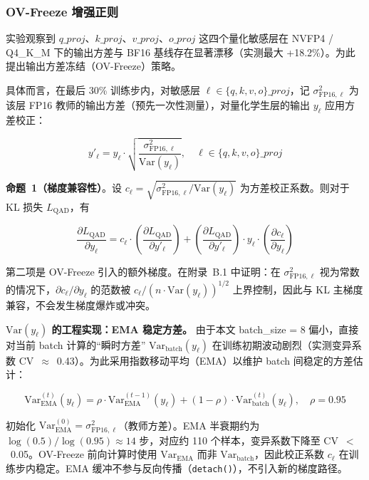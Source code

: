 \documentclass[UTF8,a4paper,10pt,twocolumn]{ctexart}
\theoremstyle{plain}
\newcommand{\Var}{\mathrm{Var}}
\begin{document}
\subsubsection{OV-Freeze 增强正则}

实验观察到 $q\_proj$、$k\_proj$、$v\_proj$、$o\_proj$ 这四个量化敏感层在 NVFP4 / Q4\_K\_M 下的输出方差与 BF16 基线存在显著漂移（实测最大 +18.2\%）。为此提出输出方差冻结（OV-Freeze）策略。

具体而言，在最后 30\% 训练步内，对敏感层 $\ell \in \{q,k,v,o\}\_proj$，记 $\sigma^2_{\mathrm{FP16},\ell}$ 为该层 FP16 教师的输出方差（预先一次性测量），对量化学生层的输出 $y_\ell$ 应用方差校正：

\begin{equation}\label{eq:ovf}
y'_\ell = y_\ell \cdot \sqrt{\frac{\sigma^2_{\mathrm{FP16},\ell}}{\Var(y_\ell)}}, \quad \ell \in \{q,k,v,o\}\_proj
\end{equation}

\textbf{命题~1（梯度兼容性）}。设 $c_\ell = \sqrt{\sigma^2_{\mathrm{FP16},\ell} / \Var(y_\ell)}$ 为方差校正系数。则对于 KL 损失 $L_{\mathrm{QAD}}$，有

\begin{equation}\label{eq:grad}
\frac{\partial L_{\mathrm{QAD}}}{\partial y_\ell} = c_\ell \cdot \left(\frac{\partial L_{\mathrm{QAD}}}{\partial y'_\ell}\right) + \left(\frac{\partial L_{\mathrm{QAD}}}{\partial y'_\ell}\right) \cdot y_\ell \cdot \left(\frac{\partial c_\ell}{\partial y_\ell}\right)
\end{equation}

第二项是 OV-Freeze 引入的额外梯度。在附录~B.1 中证明：在 $\sigma^2_{\mathrm{FP16},\ell}$ 视为常数的情况下，$\partial c_\ell / \partial y_\ell$ 的范数被 $c_\ell / (n \cdot \Var(y_\ell))^{1/2}$ 上界控制，因此与 KL 主梯度兼容，不会发生梯度爆炸或冲突。

\textbf{$\Var(y_\ell)$ 的工程实现：EMA 稳定方差。} 由于本文 batch\_size = 8 偏小，直接对当前 batch 计算的“瞬时方差” $\Var_{\mathrm{batch}}(y_\ell)$ 在训练初期波动剧烈（实测变异系数 CV~$\approx$~0.43）。为此采用指数移动平均（EMA）以维护 batch 间稳定的方差估计：

\begin{equation}\label{eq:ema}
\Var_{\mathrm{EMA}}^{(t)}(y_\ell) = \rho \cdot \Var_{\mathrm{EMA}}^{(t-1)}(y_\ell) + (1-\rho) \cdot \Var_{\mathrm{batch}}^{(t)}(y_\ell), \quad \rho = 0.95
\end{equation}

初始化 $\Var_{\mathrm{EMA}}^{(0)} = \sigma^2_{\mathrm{FP16},\ell}$（教师方差）。EMA 半衰期约为 $\log(0.5)/\log(0.95) \approx 14$ 步，对应约 110 个样本，变异系数下降至 CV~$<$~0.05。OV-Freeze 前向计算时使用 $\Var_{\mathrm{EMA}}$ 而非 $\Var_{\mathrm{batch}}$，因此校正系数 $c_\ell$ 在训练步内稳定。EMA 缓冲不参与反向传播（\texttt{detach()}），不引入新的梯度路径。
\end{document}
